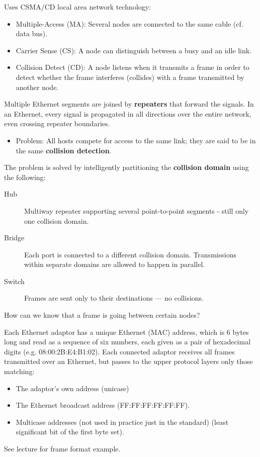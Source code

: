 \documentclass[11pt]{article}
\begin{document}
Uses CSMA/CD local area network technology:
\begin{itemize}
\item Multiple-Access (MA): Several nodes are connected to the same cable (cf. data bus).
\item Carrier Sense (CS): A node can distinguish between a busy and an idle link.
\item Collision Detect (CD): A node listens when it transmits a frame in order to detect whether the frame interferes (collides) with a frame transmitted by another node.
\end{itemize}
Multiple Ethernet segments are joined by \textbf{repeaters} that forward the signals.
In an Ethernet, every signal is propagated in all directions over the entire network, even crossing repeater boundaries.
\begin{itemize}
\item Problem: All hosts compete for access to the same link; they are said to be in the same \textbf{collision detection}.
\end{itemize}
The problem is solved by intelligently partitioning the \textbf{collision domain} using the following:
\begin{description}
\item[{Hub}] Multiway repeater supporting several point-to-point segments - still only one collision domain.
\item[{Bridge}] Each port is connected to a different collision domain. Transmissions within separate domains are allowed to happen in parallel.
\item[{Switch}] Frames are sent only to their destinations --- no collisions.
\end{description}
How can we know that a frame is going between certain nodes?

Each Ethernet adaptor has a unique Ethernet (MAC) address, which is 6 bytes long and read as a sequence of six numbers, each given as a pair of hexadecimal digits (e.g. 08:00:2B:E4:B1:02).
Each connected adaptor receives all frames transmitted over an Ethernet, but passes to the upper protocol layers only those matching:
\begin{itemize}
\item The adaptor's own address (unicase)
\item The Ethernet broadcast address (FF:FF:FF:FF:FF:FF).
\item Multicase addresses (not used in practice just in the standard) (least significant bit of the first byte set).
\end{itemize}
See lecture for frame format example.
\end{document}
